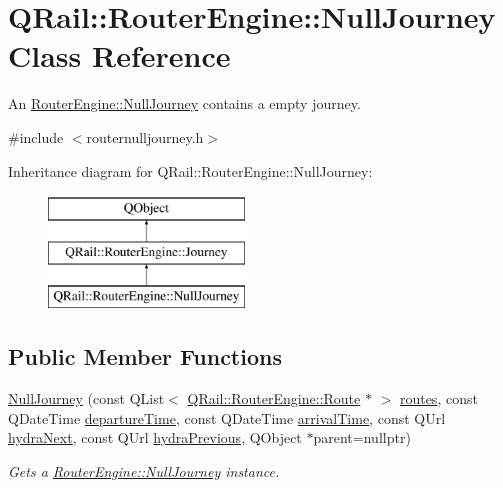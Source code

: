 \hypertarget{classQRail_1_1RouterEngine_1_1NullJourney}{}\section{Q\+Rail\+::Router\+Engine\+::Null\+Journey Class Reference}
\label{classQRail_1_1RouterEngine_1_1NullJourney}


An \mbox{\hyperlink{classQRail_1_1RouterEngine_1_1NullJourney}{Router\+Engine\+::\+Null\+Journey}} contains a empty journey.  




{\ttfamily \#include $<$routernulljourney.\+h$>$}

Inheritance diagram for Q\+Rail\+::Router\+Engine\+::Null\+Journey\+:\begin{figure}[H]
\begin{center}
\leavevmode
\includegraphics[height=3.000000cm]{classQRail_1_1RouterEngine_1_1NullJourney}
\end{center}
\end{figure}
\subsection*{Public Member Functions}
\begin{DoxyCompactItemize}
\item 
\mbox{\hyperlink{classQRail_1_1RouterEngine_1_1NullJourney_a8a26b7adf10b20622fd37c113fddcaf8}{Null\+Journey}} (const Q\+List$<$ \mbox{\hyperlink{classQRail_1_1RouterEngine_1_1Route}{Q\+Rail\+::\+Router\+Engine\+::\+Route}} $\ast$ $>$ \mbox{\hyperlink{classQRail_1_1RouterEngine_1_1Journey_ac1ead02119493cf91dc47f867034108e}{routes}}, const Q\+Date\+Time \mbox{\hyperlink{classQRail_1_1RouterEngine_1_1Journey_a58b92b24d9d29ebb3cb47994b92eaa13}{departure\+Time}}, const Q\+Date\+Time \mbox{\hyperlink{classQRail_1_1RouterEngine_1_1Journey_a8a4e6733fceea2902fc3b0f5cb6b077c}{arrival\+Time}}, const Q\+Url \mbox{\hyperlink{classQRail_1_1RouterEngine_1_1Journey_af2e3a86d876b397e5a88b89aea673145}{hydra\+Next}}, const Q\+Url \mbox{\hyperlink{classQRail_1_1RouterEngine_1_1Journey_a670dbe08bcc3ce8e8003a0429661e18f}{hydra\+Previous}}, Q\+Object $\ast$parent=nullptr)
\begin{DoxyCompactList}\small\item\em Gets a \mbox{\hyperlink{classQRail_1_1RouterEngine_1_1NullJourney}{Router\+Engine\+::\+Null\+Journey}} instance. \end{DoxyCompactList}\end{DoxyCompactItemize}
